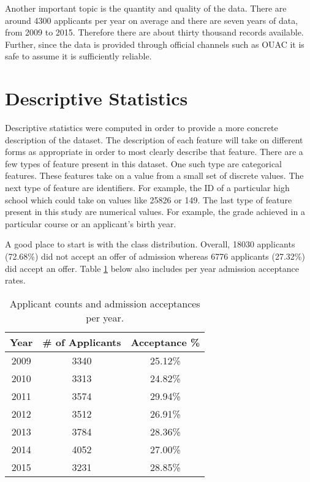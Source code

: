 Another important topic is the quantity and quality of the data. There are around 4300 applicants per year on average and there are seven years of data, from 2009 to 2015. Therefore there are about thirty thousand records available. Further, since the data is provided through official channels such as OUAC it is safe to assume it is sufficiently reliable.



\section{Descriptive Statistics}
Descriptive statistics were computed in order to provide a more concrete description of the dataset. The description of each feature will take on different forms as appropriate in order to most clearly describe that feature. There are a few types of feature present in this dataset. One such type are categorical features. These features take on a value from a small set of discrete values. The next type of feature are identifiers. For example, the ID of a particular high school which could take on values like 25826 or 149. The last type of feature present in this study are numerical values. For example, the grade achieved in a particular course or an applicant's birth year.

A good place to start is with the class distribution. Overall, 18030 applicants (72.68\%) did not accept an offer of admission whereas 6776 applicants (27.32\%) did accept an offer. Table \ref{tab:yearlyAcceptances} below also includes per year admission acceptance rates.

\begin{table}[!hb]
\begin{center}
\begin{tabular}{c|c|c}
	\textbf{Year}	&\textbf{\# of Applicants}	&\textbf{Acceptance \%}\\\hline
	2009			&3340						&25.12\%\\
	2010			&3313						&24.82\%\\
	2011			&3574						&29.94\%\\
	2012			&3512						&26.91\%\\
	2013			&3784						&28.36\%\\
	2014			&4052						&27.00\%\\
	2015			&3231						&28.85\%
\end{tabular}
\end{center}
\caption{Applicant counts and admission acceptances per year.}
\label{tab:yearlyAcceptances}
\end{table}

